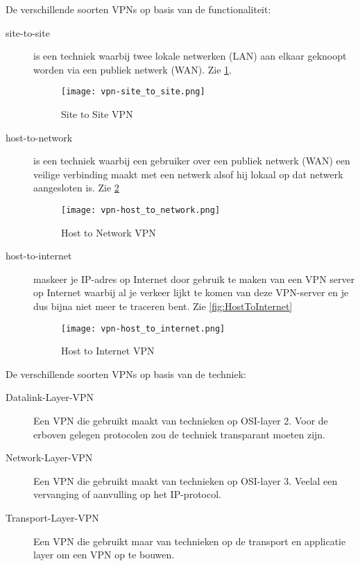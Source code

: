 De verschillende soorten VPNs op basis van de functionaliteit:
\begin{description}
	\item[site-to-site] is een techniek waarbij twee lokale netwerken (LAN) aan elkaar geknoopt worden via een publiek netwerk (WAN). Zie \ref{fig:VPNSiteToSite}.
	\begin{figure}[h]
	\texttt{[image: vpn-site\_to\_site.png]}
	\caption{Site to Site VPN}
	\label{fig:VPNSiteToSite}
	\end{figure}
\item[host-to-network] is een techniek waarbij een gebruiker over een publiek netwerk (WAN) een veilige verbinding maakt met een netwerk alsof hij lokaal op dat netwerk aangesloten is. Zie \ref{fig:VPNHostToNetwork}
	\begin{figure}[h]
	\texttt{[image: vpn-host\_to\_network.png]}
	\caption{Host to Network VPN}
	\label{fig:VPNHostToNetwork}
	\end{figure}
\item[host-to-internet] maskeer je IP-adres op Internet door gebruik te maken van een VPN server op Internet waarbij al je verkeer lijkt te komen van deze VPN-server en je dus bijna niet meer te traceren bent. Zie \ref{fig:HostToInternet}
	\begin{figure}[h]
	\texttt{[image: vpn-host\_to\_internet.png]}
	\caption{Host to Internet VPN}
	\label{fig:VPNHostToInternet}
	\end{figure}
\end{description}

De verschillende soorten VPNs op basis van de techniek:
\begin{description}
\item[Datalink-Layer-VPN] Een VPN die gebruikt maakt van technieken op OSI-layer 2. Voor de erboven gelegen protocolen zou de techniek transparant moeten zijn.
\item[Network-Layer-VPN] Een VPN die gebruikt maakt van technieken op OSI-layer 3. Veelal een vervanging of aanvulling op het IP-protocol.
\item[Transport-Layer-VPN] Een VPN die gebruikt maar van technieken op de transport en applicatie layer om een VPN op te bouwen.
\end{description}

